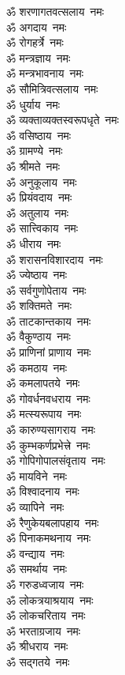\begin{multicols}{2}
\begin{flushleft}
ॐ शरणागतवत्सलाय~नमः\\
ॐ अगदाय~नमः\\
ॐ रोगहर्त्रे~नमः\\
ॐ मन्त्रज्ञाय~नमः\\
ॐ मन्त्रभावनाय~नमः\\
ॐ सौमित्रिवत्सलाय~नमः\\
ॐ धुर्याय~नमः\\
ॐ व्यक्ताव्यक्तस्वरूपधृते~नमः\\
ॐ वसिष्ठाय~नमः\hfill{}\\
ॐ ग्रामण्ये~नमः\\
ॐ श्रीमते~नमः\\
ॐ अनुकूलाय~नमः\\
ॐ प्रियंवदाय~नमः\\
ॐ अतुलाय~नमः\\
ॐ सात्त्विकाय~नमः\\
ॐ धीराय~नमः\\
ॐ शरासनविशारदाय~नमः\\
ॐ ज्येष्ठाय~नमः\\
ॐ सर्वगुणोपेताय~नमः\hfill{}\\
ॐ शक्तिमते~नमः\\
ॐ ताटकान्तकाय~नमः\\
ॐ वैकुण्ठाय~नमः\\
ॐ प्राणिनां प्राणाय~नमः\\
ॐ कमठाय~नमः\\
ॐ कमलापतये~नमः\\
ॐ गोवर्धनवधराय~नमः\\
ॐ मत्स्यरूपाय~नमः\\
ॐ कारुण्यसागराय~नमः\\
ॐ कुम्भकर्णप्रभेत्त्रे~नमः\hfill{}\\
ॐ गोपिगोपालसंवृताय~नमः\\
ॐ मायविने~नमः\\
ॐ विश्वादनाय~नमः\\
ॐ व्यापिने~नमः\\
ॐ रैणुकेयबलापहाय~नमः\\
ॐ पिनाकमथनाय~नमः\\
ॐ वन्द्याय~नमः\\
ॐ समर्थाय~नमः\\
ॐ गरुडध्वजाय~नमः\\
ॐ लोकत्रयाश्रयाय~नमः\hfill{}\\
ॐ लोकचरिताय~नमः\\
ॐ भरताग्रजाय~नमः\\
ॐ श्रीधराय~नमः\\
ॐ सद्गतये~नमः\\

\end{flushleft}
\end{multicols}
